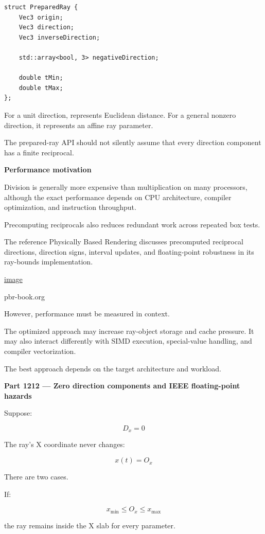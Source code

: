 \begin{verbatim}
struct PreparedRay {
    Vec3 origin;
    Vec3 direction;
    Vec3 inverseDirection;

    std::array<bool, 3> negativeDirection;

    double tMin;
    double tMax;
};
\end{verbatim}

For a unit direction,  represents Euclidean distance. For a general nonzero direction, it represents an affine ray parameter.

The prepared-ray API should not silently assume that every direction component has a finite reciprocal.

\textbf{Performance motivation}

Division is generally more expensive than multiplication on many processors, although the exact performance depends on CPU architecture, compiler optimization, and instruction throughput.

Precomputing reciprocals also reduces redundant work across repeated box tests.

The reference Physically Based Rendering discusses precomputed reciprocal directions, direction signs, interval updates, and floating-point robustness in its ray-bounds implementation. 

\href{https://www.google.com/s2/favicons?domain=https://www.pbr-book.org&sz=32}{image}

pbr-book.org

However, performance must be measured in context.

The optimized approach may increase ray-object storage and cache pressure. It may also interact differently with SIMD execution, special-value handling, and compiler vectorization.

The best approach depends on the target architecture and workload.

\textbf{Part 1212 --- Zero direction components and IEEE floating-point hazards}

Suppose:

\[
D_x=0
\]

The ray's X coordinate never changes:

\[
x(t)=O_x
\]

There are two cases.

If:

\[
x_{\min}\le O_x\le x_{\max}
\]

the ray remains inside the X slab for every parameter.

